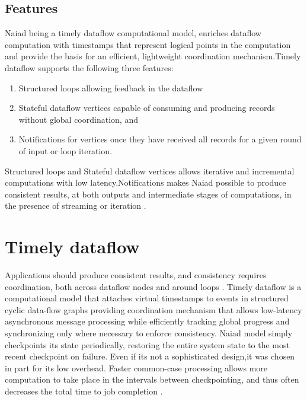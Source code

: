 \documentclass[9pt,twocolumn,twoside]{../../styles/osajnl}
\begin{document}
\subsection{Features} 
Naiad being a timely dataflow computational model, enriches dataflow
computation with timestamps that represent logical points in the
computation and provide the basis for an efficient, lightweight
coordination mechanism.Timely dataflow supports the following three
features:

\begin{enumerate}
\item Structured loops allowing feedback in the dataflow
\item Stateful dataflow vertices capable of consuming and producing
  records without global coordination, and
\item Notifications for vertices once they have received all records
  for a given round of input or loop iteration.
\end{enumerate}

Structured loops and Stateful dataflow vertices allows iterative and
incremental computations with low latency.Notifications makes Naiad
possible to produce consistent results, at both outputs and
intermediate stages of computations, in the presence of streaming or
iteration \cite{paper1-Naiad}.

\section{Timely dataflow}


Applications should produce consistent results, and consistency
requires coordination, both across dataflow nodes and around loops
\cite{paper1-Naiad}. Timely dataflow is a computational model that
attaches virtual timestamps to events in structured cyclic data-flow
graphs providing coordination mechanism that allows low-latency
asynchronous message processing while efficiently tracking global
progress and synchronizing only where necessary to enforce
consistency. Naiad model simply checkpoints its state periodically,
restoring the entire system state to the most recent checkpoint on
failure. Even if its  not a sophisticated design,it was chosen in part for its low
overhead. Faster common-case processing allows more computation to
take place in the intervals between checkpointing, and thus often
decreases the total time to job completion \cite{paper3-Naiad}.
\end{document}
